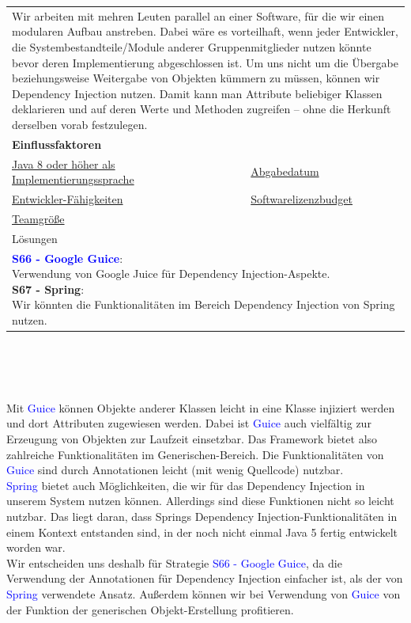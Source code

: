 \documentclass[enabledeprecatedfontcommands,fontsize=11pt,paper=a4,twoside]{scrartcl}
\newcounter{one}
\newcommand{\cb}[1]{{\textcolor{blue}{#1}}}
\begin{document}
\newpage
\begin{tabular} {|p{8cm} p{8cm}|}
	\hline
	\rowcolor{prob}\multicolumn{2}{|l|}{\parbox{16cm}{\textbf{26: Dependency Injection}}} \\  \hline\hline 
	\multicolumn{2}{|l|}{\parbox{16cm}{Wir arbeiten mit mehren Leuten parallel an einer Software, für die wir einen modularen Aufbau anstreben. Dabei wäre es vorteilhaft, wenn jeder Entwickler, die Systembestandteile/Module anderer Gruppenmitglieder nutzen könnte bevor deren Implementierung abgeschlossen ist. Um uns nicht um die Übergabe beziehungsweise Weitergabe von Objekten kümmern zu müssen, können wir Dependency Injection nutzen. Damit kann man Attribute beliebiger Klassen deklarieren und auf deren Werte und Methoden zugreifen – ohne die Herkunft derselben vorab festzulegen.}}\rule{0pt}{10ex}\\ [7ex] \hline
	\multicolumn{2}{|l|}{\textbf{Einflussfaktoren}}\\
	\hyperlink{b}{Java 8 oder höher als Implementierungssprache} &  \hyperlink {uu}{Abgabedatum} \\
	\hyperlink {vv}{Entwickler-Fähigkeiten} &
 	\hyperlink {ww}{Softwarelizenzbudget} \\
	\hyperlink {xx}{Teamgröße} &
   \\ \hline
	\multicolumn{2}{|l|}{Lösungen} \\
	\multicolumn{2}{|l|}{\parbox{16cm}{
			\textbf{\cb{\hypertarget{guice}{S66 - Google Guice}}}: \\
	Verwendung von Google Juice für Dependency Injection-Aspekte.\\
			\textbf{S67 - Spring}: \\
	Wir könnten die Funktionalitäten im Bereich Dependency Injection von Spring nutzen.
	} }\\ [6ex] \hline
\end{tabular}\\ \\ \\
\begin{onehalfspace}
	Mit \cb{Guice} können Objekte anderer Klassen leicht in eine Klasse injiziert werden und dort Attributen zugewiesen werden. Dabei ist \cb{Guice} auch vielfältig zur Erzeugung von Objekten zur Laufzeit einsetzbar. Das Framework bietet also zahlreiche Funktionalitäten im Generischen-Bereich. Die Funktionalitäten von \cb{Guice} sind durch Annotationen leicht (mit wenig Quellcode) nutzbar. \\
	\cb{Spring} bietet auch Möglichkeiten, die wir für das Dependency Injection in unserem System nutzen können. Allerdings sind diese Funktionen nicht so leicht nutzbar. Das liegt daran, dass Springs Dependency Injection-Funktionalitäten in einem Kontext entstanden sind, in der noch nicht einmal Java 5 fertig entwickelt worden war. \\
	Wir entscheiden uns deshalb für Strategie \cb{S66 - Google Guice}, da die Verwendung der Annotationen für Dependency Injection einfacher ist, als der von \cb{Spring} verwendete Ansatz. Außerdem können wir bei Verwendung von \cb{Guice} von der Funktion der generischen Objekt-Erstellung profitieren.
\end{onehalfspace}
\end{document}
